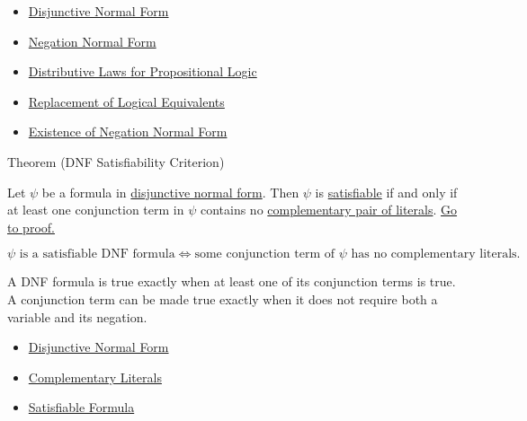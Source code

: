 \begin{dependencies}
\begin{itemize}
  \item \hyperref[def:disjunctive-normal-form-propositional-logic]{Disjunctive Normal Form}
  \item \hyperref[def:negation-normal-form-propositional-logic]{Negation Normal Form}
  \item \hyperref[thm:distributive-laws-propositional-logic]{Distributive Laws for Propositional Logic}
  \item \hyperref[thm:replacement-of-logical-equivalents-propositional-logic]{Replacement of Logical Equivalents}
  \item \hyperref[thm:existence-negation-normal-form-propositional-logic]{Existence of Negation Normal Form}
\end{itemize}
\end{dependencies}

\begin{theorembox}{Theorem (DNF Satisfiability Criterion)}
\begin{theorem}
\label{thm:dnf-satisfiability-criterion-propositional-logic}
Let \(\psi\) be a formula in
\hyperref[def:disjunctive-normal-form-propositional-logic]{disjunctive normal form}.
Then \(\psi\) is
\hyperref[def:satisfiable-formula-propositional-logic]{satisfiable} if and only
if at least one conjunction term in \(\psi\) contains no
\hyperref[def:complementary-literals-propositional-logic]{complementary pair of literals}.
\noindent\hyperref[prf:dnf-satisfiability-criterion-propositional-logic]{Go to proof.}
\end{theorem}
\end{theorembox}

\begin{remark*}
\[
\psi\text{ is a satisfiable DNF formula}
\Longleftrightarrow
\text{some conjunction term of }\psi\text{ has no complementary literals.}
\]
\end{remark*}

\begin{remark*}[Interpretation]
A DNF formula is true exactly when at least one of its conjunction terms is
true. A conjunction term can be made true exactly when it does not require both
a variable and its negation.
\end{remark*}

\begin{dependencies}
\begin{itemize}
  \item \hyperref[def:disjunctive-normal-form-propositional-logic]{Disjunctive Normal Form}
  \item \hyperref[def:complementary-literals-propositional-logic]{Complementary Literals}
  \item \hyperref[def:satisfiable-formula-propositional-logic]{Satisfiable Formula}
\end{itemize}
\end{dependencies}
